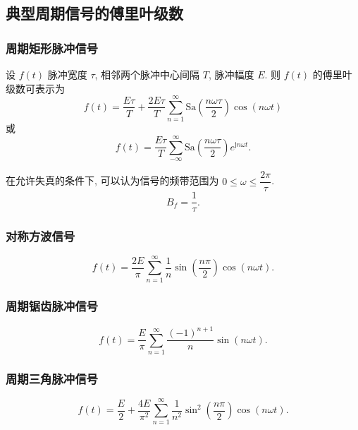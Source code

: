 \subsection{典型周期信号的傅里叶级数} \label{3 典型周期信号的傅里叶级数}
\subsubsection{周期矩形脉冲信号}
设 $f(t)$ 脉冲宽度 $\tau$, 相邻两个脉冲中心间隔 $T$, 脉冲幅度 $E$. 则 $f(t)$ 的傅里叶级数可表示为
\begin{equation}
    f(t)=\frac{E\tau}{T}+\frac{2E\tau}{T}\sum_{n=1}^{\infty}\mathrm{Sa}\left(\frac{n\omega\tau}{2}\right)\cos(n\omega t)
\end{equation}
或
\begin{equation}
    f(t)=\frac{E\tau}{T}\sum_{-\infty}^{\infty}\mathrm{Sa}\left(\frac{n\omega\tau}{2}\right)e^{\mathrm{j}n\omega t}.
\end{equation}

在允许失真的条件下, 可以认为信号的频带范围为 $0\leq \omega\leq \dfrac{2\pi}{\tau}$.
\begin{equation} \label{eq:3.2 periodic rect signal Bf}
    B_f=\frac{1}{\tau}.
\end{equation}

\subsubsection{对称方波信号}
\srmg
\begin{equation}
    f(t)=\frac{2E}{\pi}\sum_{n=1}^{\infty}\frac{1}{n}\sin\left(\frac{n\pi}{2}\right)\cos(n\omega t).
\end{equation}

\subsubsection{周期锯齿脉冲信号}
\srmg
\begin{equation}
    f(t)=\frac{E}{\pi}\sum_{n=1}^{\infty}\frac{(-1)^{n+1}}{n}\sin(n\omega t).
\end{equation}

\subsubsection{周期三角脉冲信号}
\srmg
\begin{equation}
    f(t)=\frac{E}{2}+\frac{4E}{\pi^2}\sum_{n=1}^{\infty}\frac{1}{n^2}\sin^2\left(\frac{n\pi}{2}\right)\cos(n\omega t).
\end{equation}

